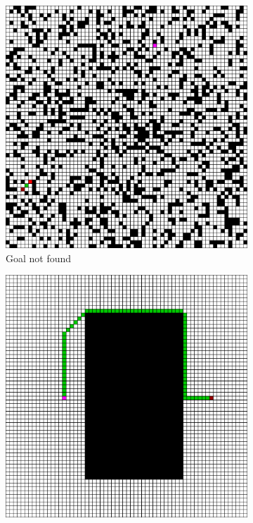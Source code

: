 \begin{figure}[h!]
  \centerfloat
  \begin{subfigure}[b]{0.33\linewidth}
    \includegraphics[width=\linewidth]{images/cae_lstm_1_block.png}
     \caption{Goal not found}
  \end{subfigure}
  \hfill
  \begin{subfigure}[b]{0.33\linewidth}
    \includegraphics[width=\linewidth]{images/cae_lstm_2_block.png}

\end{subfigure}
\end{figure}
